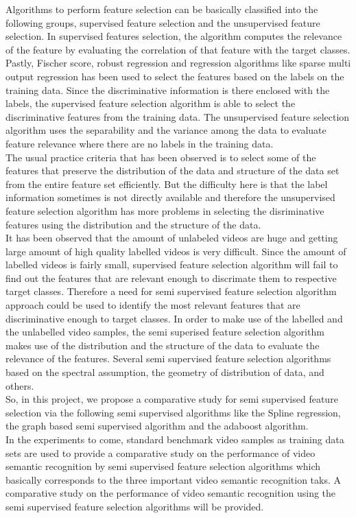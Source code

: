\documentclass[a4paper,12pt]{article}
\begin{document}
Algorithms to perform feature selection can be basically classified into the following groups, supervised feature selection and the unsupervised feature selection. In supervised features selection, the algorithm computes the relevance of the feature by evaluating the correlation of that feature with the target classes. Pastly, Fischer score, robust regression and regression algorithms like sparse multi output regression has been used to select the features based on the labels on the training data. Since the discriminative information is there enclosed with the labels, the supervised feature selection algorithm is able to select the discriminative features from the training data. The unsupervised feature selection algorithm uses the separability and the variance among the data to evaluate feature relevance where there are no labels in the training data. \\ The usual practice criteria that has been observed is to select some of the features that preserve the distribution of the data and structure of the data set from the entire feature set efficiently. But the difficulty here is that the label information sometimes is not directly available and therefore the unsupervised feature selection algorithm has more problems in selecting the disriminative features using the distribution and the structure of the data. \\
It has been observed that the amount of unlabeled videos are huge and getting large amount of high quality labelled videos is very difficult. Since the amount of labelled videos is fairly small, supervised feature selection algorithm will fail to find out the features that are relevant enough to discrimate them to respective target classes. Therefore a need for semi supervised feature selection algorithm approach could be used to identify the most relevant features that are discriminative enough to target classes. In order to make use of the labelled and the unlabelled video samples, the semi superised feature selection algorithm makes use of the distribution and the structure of the data to evaluate the relevance of the features. Several semi supervised feature selection algorithms based on the spectral assumption, the geometry of distribution of data, and others. \\
So, in this project, we propose a comparative study for semi supervised feature selection via the following semi supervised algorithms like the Spline regression, the graph based semi supervised algorithm and the adaboost algorithm. \\
In the experiments to come, standard benchmark video samples as training data sets are used to provide a comparative study on the performance of video semantic recognition by semi supervised feature selection algorithms which basically corresponds to the three important video semantic recognition taks. A comparative study on the performance of video semantic recognition using the semi supervised feature selection algorithms will be provided.
\end{document}

